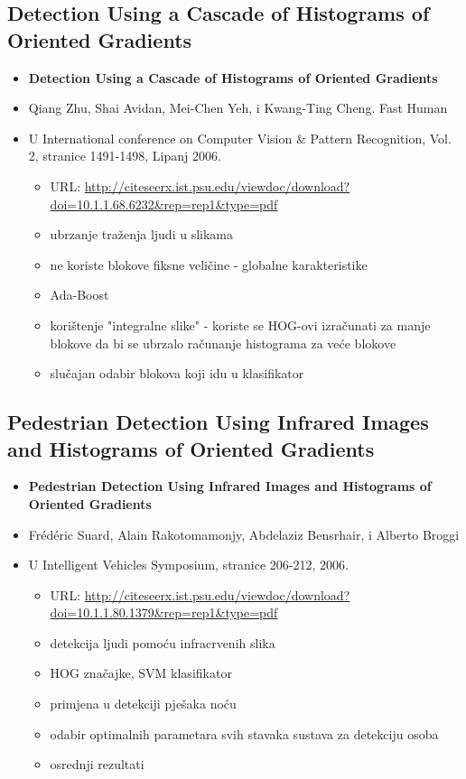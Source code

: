 \documentclass[times, utf8, seminar, numeric]{fer}
\begin{document}
\subsection{Detection Using a Cascade of Histograms of Oriented Gradients}
\begin{itemize}
\item \textbf{Detection Using a Cascade of Histograms of Oriented Gradients}
\item Qiang Zhu, Shai Avidan, Mei-Chen Yeh, i Kwang-Ting Cheng. Fast Human 
\item U International conference on Computer Vision \& Pattern Recognition, Vol. 2, stranice 1491-1498, Lipanj 2006. 
	\begin{itemize}
		\item URL: \url{http://citeseerx.ist.psu.edu/viewdoc/download?doi=10.1.1.68.6232&rep=rep1&type=pdf}
		\item ubrzanje traženja ljudi u slikama
		\item ne koriste blokove fiksne veličine - globalne karakteristike
		\item Ada-Boost
		\item korištenje "integralne slike" - koriste se HOG-ovi izračunati za manje blokove da bi se ubrzalo računanje histograma za veće blokove
		\item slučajan odabir blokova koji idu u klasifikator
	\end{itemize}
\end{itemize}

\subsection{Pedestrian Detection Using Infrared Images and Histograms of Oriented Gradients}
\begin{itemize}
\item \textbf{Pedestrian Detection Using Infrared Images and Histograms of Oriented Gradients}
\item Frédéric Suard, Alain Rakotomamonjy, Abdelaziz Bensrhair, i Alberto Broggi
\item U Intelligent Vehicles Symposium, stranice 206-212, 2006. 
\begin{itemize}
	\item URL: \url{http://citeseerx.ist.psu.edu/viewdoc/download?doi=10.1.1.80.1379&rep=rep1&type=pdf}
	\item detekcija ljudi pomoću infracrvenih slika
	\item HOG značajke, SVM klasifikator
	\item primjena u detekciji pješaka noću
	\item odabir optimalnih parametara svih stavaka sustava za detekciju osoba
	\item osrednji rezultati
\end{itemize}
\end{itemize}
\end{document}

